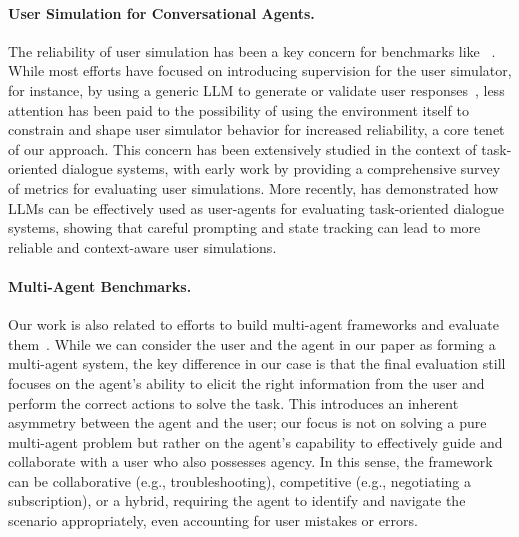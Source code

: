 \paragraph{User Simulation for Conversational Agents.}
The reliability of user simulation has been a key concern for benchmarks like \taubench~\cite{yao2024tau}. While most efforts have focused on introducing supervision for the user simulator, for instance, by using a generic LLM to generate or validate user responses~\cite{prabhakar2025apigen}, less attention has been paid to the possibility of using the environment itself to constrain and shape user simulator behavior for increased reliability, a core tenet of our approach. This concern has been extensively studied in the context of task-oriented dialogue systems, with early work by \cite{pietquin_survey_2013} providing a comprehensive survey of metrics for evaluating user simulations. More recently, \cite{kazi_large_2024} has demonstrated how LLMs can be effectively used as user-agents for evaluating task-oriented dialogue systems, showing that careful prompting and state tracking can lead to more reliable and context-aware user simulations.

\paragraph{Multi-Agent Benchmarks.}
Our work is also related to efforts to build multi-agent frameworks and evaluate them~\cite{zhu2025multiagentbench}.
While we can consider the user and the agent in our paper as forming a multi-agent system, the key difference in our case is that the final evaluation still focuses on the agent's ability to elicit the right information from the user and perform the correct actions to solve the task. This introduces an inherent asymmetry between the agent and the user; our focus is not on solving a pure multi-agent problem but rather on the agent's capability to effectively guide and collaborate with a user who also possesses agency. In this sense, the framework can be collaborative (e.g., troubleshooting), competitive (e.g., negotiating a subscription), or a hybrid, requiring the agent to identify and navigate the scenario appropriately, even accounting for user mistakes or errors.
